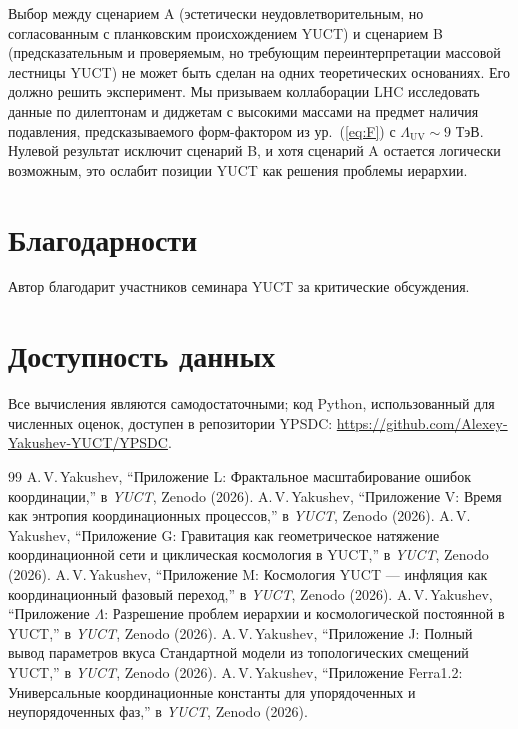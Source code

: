 \documentclass[11pt,a4paper]{article}
\newcommand{\LUV}{\Lambda_{\mathrm{UV}}}
\theoremstyle{remark}
\begin{document}
	Выбор между сценарием A (эстетически неудовлетворительным, но согласованным с планковским происхождением YUCT) и сценарием B (предсказательным и проверяемым, но требующим переинтерпретации массовой лестницы YUCT) не может быть сделан на одних теоретических основаниях. Его должно решить эксперимент. Мы призываем коллаборации LHC исследовать данные по дилептонам и диджетам с высокими массами на предмет наличия подавления, предсказываемого форм-фактором из ур.~(\ref{eq:F}) с \(\LUV \sim 9\) ТэВ. Нулевой результат исключит сценарий B, и хотя сценарий A остается логически возможным, это ослабит позиции YUCT как решения проблемы иерархии.
	
	\section*{Благодарности}
	Автор благодарит участников семинара YUCT за критические обсуждения.
	
	\section*{Доступность данных}
	Все вычисления являются самодостаточными; код Python, использованный для численных оценок, доступен в репозитории YPSDC: \url{https://github.com/Alexey-Yakushev-YUCT/YPSDC}.
	
	\begin{thebibliography}{99}
		 A.\,V.\,Yakushev, ``Приложение L: Фрактальное масштабирование ошибок координации,'' в \emph{YUCT}, Zenodo (2026).
		 A.\,V.\,Yakushev, ``Приложение V: Время как энтропия координационных процессов,'' в \emph{YUCT}, Zenodo (2026).
		 A.\,V.\,Yakushev, ``Приложение G: Гравитация как геометрическое натяжение координационной сети и циклическая космология в YUCT,'' в \emph{YUCT}, Zenodo (2026).
		 A.\,V.\,Yakushev, ``Приложение M: Космология YUCT — инфляция как координационный фазовый переход,'' в \emph{YUCT}, Zenodo (2026).
		 A.\,V.\,Yakushev, ``Приложение \(\Lambda\): Разрешение проблем иерархии и космологической постоянной в YUCT,'' в \emph{YUCT}, Zenodo (2026).
		 A.\,V.\,Yakushev, ``Приложение J: Полный вывод параметров вкуса Стандартной модели из топологических смещений YUCT,'' в \emph{YUCT}, Zenodo (2026).
		 A.\,V.\,Yakushev, ``Приложение Ferra1.2: Универсальные координационные константы для упорядоченных и неупорядоченных фаз,'' в \emph{YUCT}, Zenodo (2026).
	\end{thebibliography}
	
\end{document}
